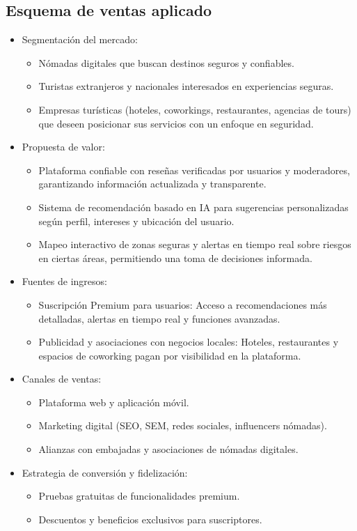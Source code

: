 \subsection{Esquema de ventas aplicado}

\begin{itemize}
    \item Segmentación del mercado:
    \begin{itemize}
    \item Nómadas digitales que buscan destinos seguros y confiables.
    \item Turistas extranjeros y nacionales interesados en experiencias seguras.
    \item Empresas turísticas (hoteles, coworkings, restaurantes, agencias de tours) que deseen posicionar sus servicios con un enfoque en seguridad.
    \end{itemize}
    \item Propuesta de valor:
    \begin{itemize}
        \item Plataforma confiable con reseñas verificadas por usuarios y moderadores, garantizando información actualizada y transparente.
        \item Sistema de recomendación basado en IA para sugerencias personalizadas según perfil, intereses y ubicación del usuario.
        \item Mapeo interactivo de zonas seguras y alertas en tiempo real sobre riesgos en ciertas áreas, permitiendo una toma de decisiones informada.

    \end{itemize}
    \item Fuentes de ingresos:
    \begin{itemize}
        \item Suscripción Premium para usuarios: Acceso a recomendaciones más detalladas, alertas en tiempo real y funciones avanzadas.
        \item Publicidad y asociaciones con negocios locales: Hoteles, restaurantes y espacios de coworking pagan por visibilidad en la plataforma.
    \end{itemize}
    
   \item Canales de ventas:
    \begin{itemize}
        \item Plataforma web y aplicación móvil.
        \item Marketing digital (SEO, SEM, redes sociales, influencers nómadas).
        \item Alianzas con embajadas y asociaciones de nómadas digitales.
    \end{itemize}
   \item Estrategia de conversión y fidelización:
    \begin{itemize}
        \item Pruebas gratuitas de funcionalidades premium.
        \item Descuentos y beneficios exclusivos para suscriptores.
    \end{itemize}
\end{itemize} 

